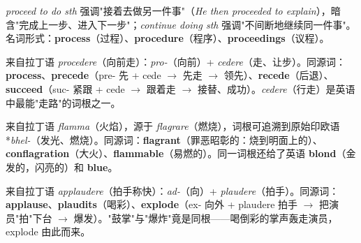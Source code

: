\documentclass[../main.tex]{subfiles}
\begin{document}

\begin{gram}
\textit{proceed to do sth} 强调"接着去做另一件事"（\textit{He then proceeded to explain}），暗含"完成上一步、进入下一步"；\textit{continue doing sth} 强调"不间断地继续同一件事"。名词形式：\textbf{process}（过程）、\textbf{procedure}（程序）、\textbf{proceedings}（议程）。
\end{gram}

\begin{origin}
来自拉丁语 \textit{procedere}（向前走）：\textit{pro-}（向前）+ \textit{cedere}（走、让步）。同源词：\textbf{process}、\textbf{precede}（pre- 先 + cede $\to$ 先走 $\to$ 领先）、\textbf{recede}（后退）、\textbf{succeed}（suc- 紧跟 + cede $\to$ 跟着走 $\to$ 接替、成功）。\textit{cedere}（行走）是英语中最能"走路"的词根之一。
\end{origin}




\begin{origin}
来自拉丁语 \textit{flamma}（火焰），源于 \textit{flagrare}（燃烧），词根可追溯到原始印欧语 *\textit{bhel-}（发光、燃烧）。同源词：\textbf{flagrant}（罪恶昭彰的：烧到明面上的）、\textbf{conflagration}（大火）、\textbf{flammable}（易燃的）。同一词根还给了英语 \textbf{blond}（金发的，闪亮的）和 \textbf{blue}。
\end{origin}



\begin{origin}
来自拉丁语 \textit{applaudere}（拍手称快）：\textit{ad-}（向）+ \textit{plaudere}（拍手）。同源词：\textbf{applause}、\textbf{plaudits}（喝彩）、\textbf{explode}（ex- 向外 + plaudere 拍手 $\to$ 把演员"拍"下台 $\to$ 爆发）。"鼓掌"与"爆炸"竟是同根——喝倒彩的掌声轰走演员，explode 由此而来。
\end{origin}
\end{document}
